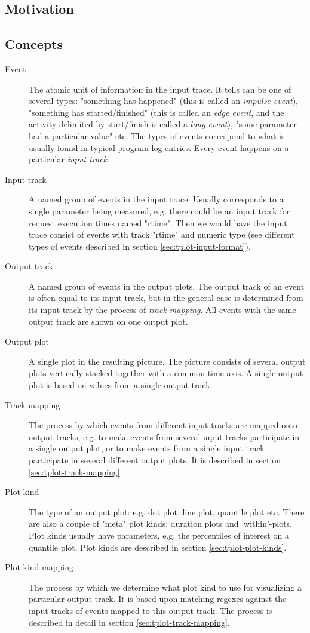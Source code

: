 \documentclass{article}
\begin{document}
\subsection{Motivation}

\subsection{Concepts}
\label{sec:tplot-concepts}

\begin{description}
\item[Event] The atomic unit of information in the input trace. It tells can be one of several types: "something has happened" (this is called an \emph{impulse event}), "something has started/finished" (this is called an \emph{edge event}, and the activity delimited by start/finish is called a \emph{long event}), "some parameter had a particular value" etc. The types of events correspond to what is usually found in typical program log entries. Every event happens on a particular \emph{input track}.
\item[Input track] A named group of events in the input trace. Usually corresponds to a single parameter being measured, e.g. there could be an input track for request execution times named "rtime". Then we would have the input trace consist of events with track "rtime" and numeric type (see different types of events described in section \ref{sec:tplot-input-format}).
\item[Output track] A named group of events in the output plots. The output track of an event is often equal to its input track, but in the general case is determined from its input track by the process of \emph{track mapping}. All events with the same output track are shown on one output plot.
\item[Output plot] A single plot in the resulting picture. The picture consists of several output plots vertically stacked together with a common time axis. A single output plot is based on values from a single output track.
\item[Track mapping] The process by which events from different input tracks are mapped onto output tracks, e.g. to make events from several input tracks participate in a single output plot, or to make events from a single input track participate in several different output plots. It is described in section \ref{sec:tplot-track-mapping}.
\item[Plot kind] The type of an output plot: e.g. dot plot, line plot, quantile plot etc. There are also a couple of "meta" plot kinds: duration plots and 'within'-plots. Plot kinds usually have parameters, e.g. the percentiles of interest on a quantile plot. Plot kinds are described in section \ref{sec:tplot-plot-kinds}.
\item[Plot kind mapping] The process by which we determine what plot kind to use for visualizing a particular output track. It is based upon matching regexes against the input tracks of events mapped to this output track. The process is described in detail in section \ref{sec:tplot-track-mapping}.
\end{description}
\end{document}
